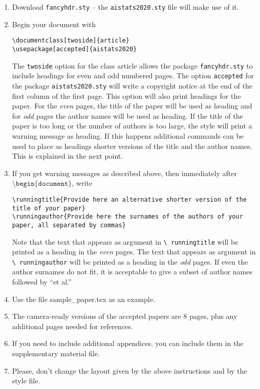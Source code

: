 \documentclass[twoside]{article}
\begin{document}
\begin{enumerate}
    \item Download \texttt{fancyhdr.sty} -- the
    \texttt{aistats2020.sty} file will make use of it.
    \item Begin your document with
    \begin{flushleft}
    \texttt{\textbackslash documentclass[twoside]\{article\}}\\
    \texttt{\textbackslash usepackage[accepted]\{aistats2020\}}
    \end{flushleft}
    The \texttt{twoside} option for the class article allows the
    package \texttt{fancyhdr.sty} to include headings for even and odd
    numbered pages. The option \texttt{accepted} for the package
    \texttt{aistats2020.sty} will write a copyright notice at the end of
    the first column of the first page. This option will also print
    headings for the paper.  For the \emph{even} pages, the title of
    the paper will be used as heading and for \emph{odd} pages the
    author names will be used as heading.  If the title of the paper
    is too long or the number of authors is too large, the style will
    print a warning message as heading. If this happens additional
    commands can be used to place as headings shorter versions of the
    title and the author names. This is explained in the next point.
    \item  If you get warning messages as described above, then
    immediately after $\texttt{\textbackslash
    begin\{document\}}$, write
    \begin{flushleft}
    \texttt{\textbackslash runningtitle\{Provide here an alternative
    shorter version of the title of your paper\}}\\
    \texttt{\textbackslash runningauthor\{Provide here the surnames of
    the authors of your paper, all separated by commas\}}
    \end{flushleft}
    Note that the text that appears as argument in \texttt{\textbackslash
      runningtitle} will be printed as a heading in the \emph{even}
    pages. The text that appears as argument in \texttt{\textbackslash
      runningauthor} will be printed as a heading in the \emph{odd}
    pages.  If even the author surnames do not fit, it is acceptable
    to give a subset of author names followed by ``et al.''

    \item Use the file sample\_paper.tex as an example.

    \item The camera-ready versions of the accepted papers are 8
      pages, plus any additional pages needed for references.

    \item If you need to include additional appendices,
      you can include them in the supplementary
      material file.

    \item Please, don't change the layout given by the above
      instructions and by the style file.

\end{enumerate}
\end{document}
